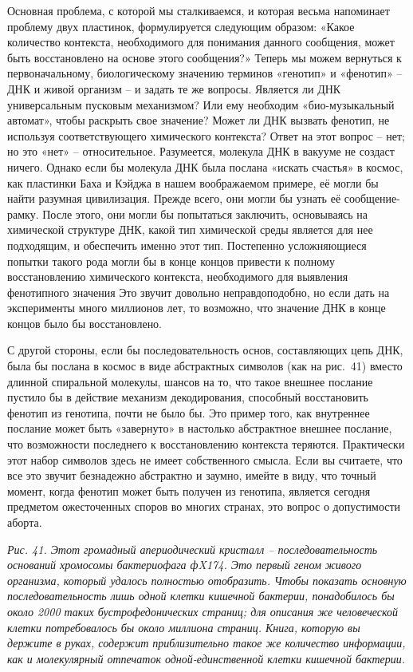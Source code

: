 \documentclass[../main.tex]{subfiles}
\begin{document}
Основная проблема, с которой мы сталкиваемся, и которая весьма напоминает проблему двух пластинок, формулируется следующим образом: «Какое количество контекста, необходимого для понимания данного сообщения, может быть восстановлено на основе этого сообщения?» Теперь мы можем вернуться к первоначальному, биологическому значению терминов «генотип» и «фенотип» \--- ДНК и живой организм \--- и задать те же вопросы. Является ли ДНК универсальным пусковым механизмом? Или ему необходим «био-музыкальный автомат», чтобы раскрыть свое значение? Может ли ДНК вызвать фенотип, не используя соответствующего химического контекста? Ответ на этот вопрос \--- нет; но это «нет» \--- относительное. Разумеется, молекула ДНК в вакууме не создаст ничего. Однако если бы молекула ДНК была послана «искать счастья» в космос, как пластинки Баха и Кэйджа в нашем воображаемом примере, её могли бы найти разумная цивилизация. Прежде всего, они могли бы узнать её сообщение-рамку. После этого, они могли бы попытаться заключить, основываясь на химической структуре ДНК, какой тип химической среды является для нее подходящим, и обеспечить именно этот тип. Постепенно усложняющиеся попытки такого рода могли бы в конце концов привести к полному восстановлению химического контекста, необходимого для выявления фенотипного значения \@ Это звучит довольно неправдоподобно, но если дать на эксперименты много миллионов лет, то возможно, что значение ДНК в конце концов было бы восстановлено.

С другой стороны, если бы последовательность основ, составляющих цепь ДНК, была бы послана в космос в виде абстрактных символов (как на рис.~41) вместо длинной спиральной молекулы, шансов на то, что такое внешнее послание пустило бы в действие механизм декодирования, способный восстановить фенотип из генотипа, почти не было бы. Это пример того, как внутреннее послание может быть «завернуто» в настолько абстрактное внешнее послание, что возможности последнего к восстановлению контекста теряются. Практически этот набор символов здесь не имеет собственного смысла. Если вы считаете, что все это звучит безнадежно абстрактно и заумно, имейте в виду, что точный момент, когда фенотип может быть получен из генотипа, является сегодня предметом ожесточенных споров во многих странах, это вопрос о допустимости аборта.

\emph{Рис. 41. Этот громадный апериодический кристалл \--- последовательность оснований хромосомы бактериофага фX174. Это первый геном живого организма, который удалось полностью отобразить. Чтобы показать основную последовательность лишь одной клетки кишечной бактерии, понадобилось бы около 2000 таких бустрофедонических страниц; для описания же человеческой клетки потребовалось бы около миллиона страниц. Книга, которую вы держите в руках, содержит приблизительно такое же количество информации, как и молекулярный отпечаток одной-единственной клетки кишечной бактерии.}
\end{document}
